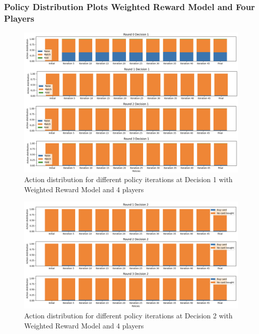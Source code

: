 \documentclass{article}
\begin{document}
\subsubsection*{Policy Distribution Plots Weighted Reward Model and Four Players}
    \begin{figure}[H]
    \centering
        \includegraphics[width=\textwidth]{report/figures/4p_d1.png}
        \caption{Action distribution for different policy iterations at Decision 1 with Weighted Reward Model and 4 players}
        \label{fig:4p_dec1_distribution}
    \end{figure}
    
    \begin{figure}[H]
    \centering
        \includegraphics[width=\textwidth]{report/figures/4p_d2.png}
        \caption{Action distribution for different policy iterations at Decision 2 with Weighted Reward Model and 4 players}
        \label{fig:4p_dec2_distribution}
    \end{figure}
    
\end{document}
